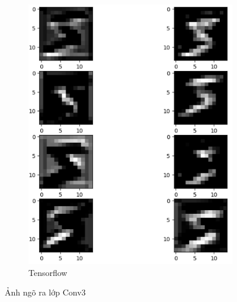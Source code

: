 \begin{figure}[H]
\begin{subfigure}[b]{0.45\linewidth}
        \includegraphics[width=1\linewidth]{Images/cnnc3.png}
        \caption{Tensorflow}
        \label{fig:enter-label}
        \end{subfigure}
    \caption{Ảnh ngõ ra lớp Conv3}
    \label{fig:main}
    \end{figure}


